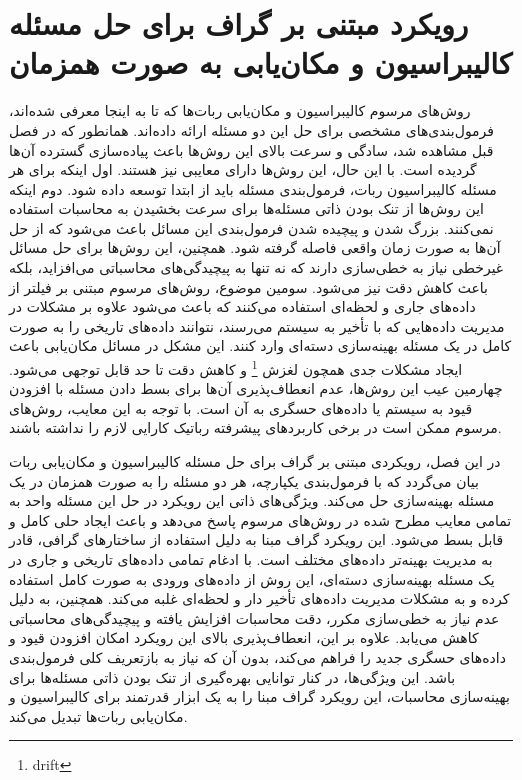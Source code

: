 \section{رویکرد مبتنی بر گراف برای حل مسئله کالیبراسیون و مکان‌یابی به صورت همزمان}
روش‌های مرسوم کالیبراسیون و مکان‌یابی ربات‌ها که تا به اینجا معرفی شده‌اند، فرمول‌بندی‌های مشخصی برای حل این دو مسئله ارائه داده‌اند. همانطور که در فصل قبل مشاهده شد، سادگی و سرعت بالای این روش‌ها باعث پیاده‌سازی گسترده آن‌ها گردیده است. با این حال، این روش‌ها دارای معایبی نیز هستند. 
اول اینکه برای هر مسئله کالیبراسیون ربات، فرمول‌بندی مسئله باید از ابتدا توسعه داده شود. دوم اینکه  این روش‌ها از تنک بودن ذاتی مسئله‌ها برای سرعت بخشیدن به محاسبات استفاده نمی‌کنند. بزرگ شدن و پیچیده شدن فرمول‌بندی این مسائل باعث می‌شود که از حل آن‌ها به صورت زمان واقعی فاصله گرفته شود.  همچنین، این روش‌ها برای حل مسائل غیرخطی نیاز به خطی‌سازی دارند که نه تنها به پیچیدگی‌های محاسباتی می‌افزاید، بلکه باعث کاهش دقت نیز می‌شود. 
سومین موضوع، روش‌های مرسوم مبتنی بر فیلتر از داده‌های جاری و لحظه‌ای استفاده می‌کنند که باعث می‌شود علاوه بر مشکلات در مدیریت داده‌هایی که با تأخیر به سیستم می‌رسند، نتوانند داده‌های تاریخی را به صورت کامل در یک مسئله بهینه‌سازی دسته‌ای وارد کنند. این مشکل در مسائل مکان‌یابی باعث ایجاد مشکلات جدی همچون لغزش
\footnote{drift}
و کاهش دقت تا حد قابل توجهی می‌شود. چهارمین عیب این روش‌ها، عدم انعطاف‌پذیری آن‌ها برای بسط دادن مسئله با افزودن قیود به سیستم یا داده‌های حسگری به آن است. با توجه به این معایب، روش‌های مرسوم ممکن است در برخی کاربردهای پیشرفته رباتیک کارایی لازم را نداشته باشند. 

در این فصل، رویکردی مبتنی بر گراف برای حل مسئله کالیبراسیون و مکان‌یابی ربات بیان می‌گردد که با فرمول‌بندی یکپارچه، هر دو مسئله را به صورت همزمان در یک مسئله بهینه‌سازی حل می‌کند. ویژگی‌های ذاتی این رویکرد در حل این مسئله واحد به تمامی معایب مطرح شده در روش‌های مرسوم پاسخ می‌دهد و باعث ایجاد حلی کامل و قابل بسط می‌شود. این رویکرد گراف مبنا به دلیل استفاده از ساختارهای گرافی، قادر به مدیریت بهینه‌تر داده‌های مختلف است. با ادغام تمامی داده‌های تاریخی و جاری در یک مسئله بهینه‌سازی دسته‌ای، این روش از داده‌های ورودی به صورت کامل استفاده کرده و به مشکلات مدیریت داده‌های تأخیر دار و لحظه‌ای غلبه می‌کند. همچنین، به دلیل عدم نیاز به خطی‌سازی مکرر، دقت محاسبات افزایش یافته و پیچیدگی‌های محاسباتی کاهش می‌یابد. علاوه بر این، انعطاف‌پذیری بالای این رویکرد امکان افزودن قیود و داده‌های حسگری جدید را فراهم می‌کند، بدون آن که نیاز به بازتعریف کلی فرمول‌بندی باشد. این ویژگی‌ها، در کنار توانایی بهره‌گیری از تنک بودن ذاتی مسئله‌ها برای بهینه‌سازی محاسبات، این رویکرد گراف مبنا را به یک ابزار قدرتمند برای کالیبراسیون و مکان‌یابی ربات‌ها تبدیل می‌کند.


